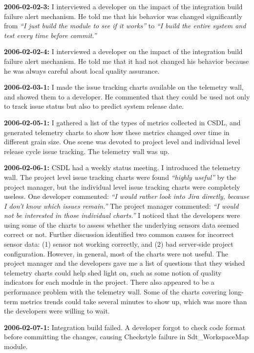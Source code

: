 \textbf{2006-02-02-3:}
I interviewed a developer on the impact of the integration build failure alert mechanism. He told me that his behavior was changed significantly from \textit{``I just build the module to see if it works''} to \textit{``I build the entire system and test every time before commit.''}

\textbf{2006-02-02-4:}
I interviewed a developer on the impact of the integration build failure alert mechanism. He told me that it had not changed his behavior because he was always careful about local quality assurance.

\textbf{2006-02-03-1:}
I made the issue tracking charts available on the telemetry wall, and showed them to a developer. He commented that they could be used not only to track issue status but also to predict system release date.

\textbf{2006-02-05-1:}
I gathered a list of the types of metrics collected in CSDL, and generated telemetry charts to show how these metrics changed over time in different grain size. One scene was devoted to project level and individual level release cycle issue tracking. The telemetry wall was up.

\textbf{2006-02-06-1:}
CSDL had a weekly status meeting. I introduced the telemetry wall.
The project level issue tracking charts were found \textit{``highly useful''} by the project manager, but the individual level issue tracking charts were completely useless. One developer commented: \textit{``I would rather look into \textit{Jira} directly, because I don't know which issues remain.''} The project manager commented: \textit{``I would not be interested in those individual charts.''}
I noticed that the developers were using some of the charts to assess whether the underlying sensors data seemed correct or not. Further discussion identified two common causes for incorrect sensor data: (1) sensor not working correctly, and (2) bad server-side project configuration.
However, in general, most of the charts were not useful. The project manager and the developers gave me a list of questions that they wished telemetry charts could help shed light on, such as some notion of quality indicators for each module in the project.
There also appeared to be a performance problem with the telemetry wall. Some of the charts covering long-term metrics trends could take several minutes to show up, which was more than the developers were willing to wait.

\textbf{2006-02-07-1:}
Integration build failed. A developer forgot to check code format before committing the changes, causing Checkstyle failure in Sdt\_WorkspaceMap module.

